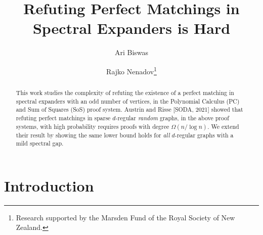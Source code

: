 \documentclass[11pt]{article}
\title{Refuting Perfect Matchings in Spectral Expanders is Hard}
\author[1]{Ari Biswas}
\author[2]{Rajko Nenadov\thanks{Research supported by the Marsden Fund of the Royal Society of New Zealand.}}
\affil[1]{\small University Of Warwick, United Kingdom}
\affil[2]{\small University Of Canterbury, New Zealand}
\date{}
\begin{document}
\maketitle
\begin{abstract}
This work studies the complexity of refuting the existence of a perfect matching in spectral expanders with an odd number of vertices, in the Polynomial Calculus (PC) and Sum of Squares (SoS) proof system.
Austrin and Risse [SODA, 2021] showed that refuting perfect matchings in sparse $d$-regular \emph{random} graphs, in the above proof systems, with high probability requires proofs with degree $\Omega(n/\log n)$. 
We extend their result by showing the same lower bound holds for \emph{all} $d$-regular graphs with a mild spectral gap.
\end{abstract}

\section{Introduction}


\end{document}
